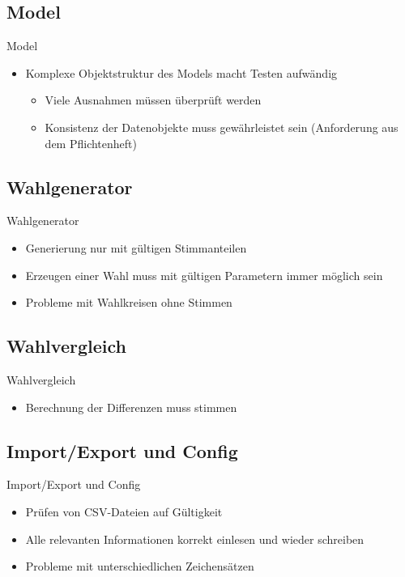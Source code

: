 \documentclass[18pt]{beamer}
\begin{document}
\subsection{Model}
\begin{frame}{Model}
\begin{itemize}
	\item Komplexe Objektstruktur des Models macht Testen aufwändig
	\begin{itemize}
		\item Viele Ausnahmen müssen überprüft werden
		\item Konsistenz der Datenobjekte muss gewährleistet sein (Anforderung aus dem Pflichtenheft)
	\end{itemize}
	
\end{itemize}
\end{frame}

\subsection{Wahlgenerator}
\begin{frame}{Wahlgenerator}
\begin{itemize}
	\item Generierung nur mit gültigen Stimmanteilen
	\item Erzeugen einer Wahl muss mit gültigen Parametern immer möglich sein
	\item Probleme mit Wahlkreisen ohne Stimmen
\end{itemize}
\end{frame}

\subsection{Wahlvergleich}
\begin{frame}{Wahlvergleich}
\begin{itemize}
	\item Berechnung der Differenzen muss stimmen
\end{itemize}
\end{frame}

\subsection{Import/Export und Config}
\begin{frame}{Import/Export und Config}
\begin{itemize}
	\item Prüfen von CSV-Dateien auf Gültigkeit
	\item Alle relevanten Informationen korrekt einlesen und wieder schreiben
	\item Probleme mit unterschiedlichen Zeichensätzen
\end{itemize}
\end{frame}
\end{document}
